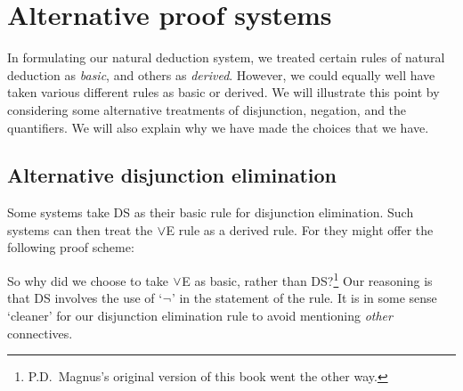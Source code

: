 
\chapter{Alternative proof systems}
In formulating our natural deduction system, we treated certain rules of natural deduction as \emph{basic}, and others as \emph{derived}. However, we could equally well have taken various different rules as basic or derived. We will illustrate this point by considering some alternative treatments of disjunction, negation, and the quantifiers. We will also explain why we have made the choices that we have.


\section{Alternative disjunction elimination}
Some systems take DS as their basic rule for disjunction elimination. Such systems can then treat the $\vee$E rule as a derived rule. For they might offer the following proof scheme: 
\begin{fitchproof}
  \open
     {}
  \close
  \open
  \close
  \open
    \open
    \close
  \close
\end{fitchproof}
So why did we choose to take $\vee$E as basic, rather than DS?\footnote{P.D.\ Magnus's original version of this book went the other way.} Our reasoning is that DS involves the use of `$\neg$' in the statement of the rule. It is in some sense `cleaner' for our disjunction elimination rule to avoid mentioning \emph{other} connectives.


